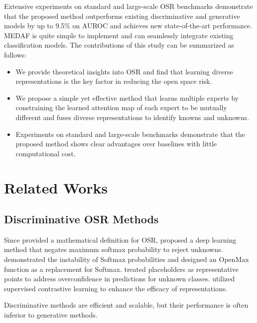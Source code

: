 \documentclass[letterpaper]{article} %
\begin{document}
Extensive experiments on standard and large-scale OSR benchmarks demonstrate that the proposed method outperforms existing discriminative and generative models by up to 9.5\% on AUROC and achieves new state-of-the-art performance. MEDAF is quite simple to implement and can seamlessly integrate existing classification models. The contributions of this study can be summarized as follows:
\begin{itemize}
\item We provide theoretical insights into OSR and find that learning diverse representations is the key factor in reducing the open space risk. 
\item We propose a simple yet effective method that learns multiple experts by constraining the learned attention map of each expert to be mutually different and fuses diverse representations to identify knowns and unknowns.
\item Experiments on standard and large-scale benchmarks demonstrate that the proposed method shows clear advantages over baselines with little computational cost.
\end{itemize}

\section{Related Works}

\subsection{Discriminative OSR Methods}
Since \cite{scheirer2013open} provided a mathematical definition for OSR, \cite{hendrycks2016a} proposed a deep learning method that negates maximum softmax probability to reject unknowns. \cite{bendale2016towards} demonstrated the instability of Softmax probabilities and designed an OpenMax function as a replacement for Softmax. \cite{zhou2021learning} treated placeholders as representative points to address overconfidence in predictions for unknown classes. \cite{xu2023contrastive} utilized supervised contrastive learning to enhance the efficacy of representations. 

Discriminative methods are efficient and scalable, but their performance is often inferior to generative methods.
\end{document}
